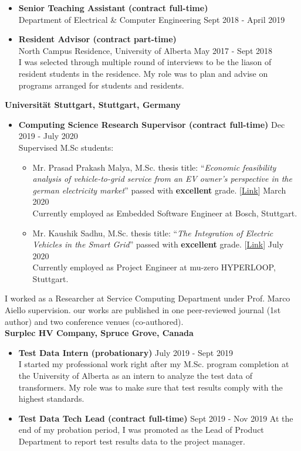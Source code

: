 \documentclass[10pt]{article}
\newenvironment{innerlist}[1][\enskip\textbullet]%
        {\begin{itemize}[#1,leftmargin=*,parsep=0pt,itemsep=0pt,topsep=0pt,partopsep=0pt]}
        {\end{itemize}}
\begin{document}
\begin{innerlist}
	\item \textbf{Senior Teaching Assistant (contract full-time)}\\Department of Electrical \& Computer Engineering \hfill Sept 2018 - April 2019
	\item \textbf{Resident Advisor (contract part-time)}\\
	North Campus Residence, University of Alberta \hfill May 2017 - Sept 2018\\
	I was selected through multiple round of interviews to be the liason of resident students in the residence. My role was to plan and advise on programs arranged for students and residents. \\
\end{innerlist}
\textbf{Universit\"at Stuttgart, Stuttgart, Germany}
\begin{innerlist}
	\item \textbf{Computing Science Research Supervisor (contract full-time)} \hfill Dec 2019 - July 2020\\
	Supervised M.Sc students:
	\begin{itemize}
		\item Mr. Prasad Prakash Malya, M.Sc. thesis title: ``\textit{Economic feasibility analysis of vehicle-to-grid service from an EV owner's perspective in the german electricity market}'' passed with \textbf{excellent} grade. [\href{https://elib.uni-stuttgart.de/handle/11682/10977}{Link}] \hfill March 2020\\ Currently employed as Embedded Software Engineer at Bosch, Stuttgart.
		\item Mr. Kaushik Sadhu, M.Sc. thesis title:
		``\textit{The Integration of Electric Vehicles in the Smart Grid}'' passed with \textbf{excellent} grade. [\href{https://elib.uni-stuttgart.de/handle/11682/11399}{Link}] \hfill July 2020\\ Currently employed as Project Engineer at mu-zero HYPERLOOP, Stuttgart.
	\end{itemize}
\end{innerlist}
	I worked as a  Researcher at Service Computing Department under Prof. Marco Aiello supervision. our works are published in one peer-reviewed journal (1st author) and two conference venues (co-authored).\\

\textbf{Surplec HV Company, Spruce Grove, Canada}
\begin{innerlist}
	\item \textbf{Test Data Intern (probationary)} \hfill July 2019 - Sept 2019\\
	I started my professional work right after my M.Sc. program completion at the University of Alberta as an intern to analyze the test data of transformers. My role was to make sure that test results comply with the highest standards.
	\item \textbf{Test Data Tech Lead (contract full-time)} \hfill Sept 2019 - Nov 2019
	At the end of my probation period, I was promoted as the Lead of Product Department to report test results data to the project manager.
\end{innerlist}
\end{document}
